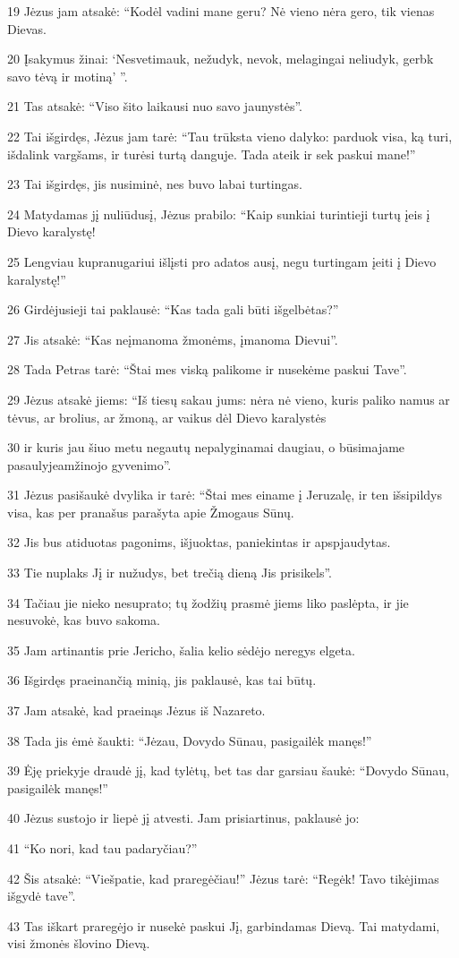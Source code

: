 \par 19 Jėzus jam atsakė: “Kodėl vadini mane geru? Nė vieno nėra gero, tik vienas Dievas. 
\par 20 Įsakymus žinai: ‘Nesvetimauk, nežudyk, nevok, melagingai neliudyk, gerbk savo tėvą ir motiną’ ”. 
\par 21 Tas atsakė: “Viso šito laikausi nuo savo jaunystės”. 
\par 22 Tai išgirdęs, Jėzus jam tarė: “Tau trūksta vieno dalyko: parduok visa, ką turi, išdalink vargšams, ir turėsi turtą danguje. Tada ateik ir sek paskui mane!” 
\par 23 Tai išgirdęs, jis nusiminė, nes buvo labai turtingas. 
\par 24 Matydamas jį nuliūdusį, Jėzus prabilo: “Kaip sunkiai turintieji turtų įeis į Dievo karalystę! 
\par 25 Lengviau kupranugariui išlįsti pro adatos ausį, negu turtingam įeiti į Dievo karalystę!” 
\par 26 Girdėjusieji tai paklausė: “Kas tada gali būti išgelbėtas?” 
\par 27 Jis atsakė: “Kas neįmanoma žmonėms, įmanoma Dievui”. 
\par 28 Tada Petras tarė: “Štai mes viską palikome ir nusekėme paskui Tave”. 
\par 29 Jėzus atsakė jiems: “Iš tiesų sakau jums: nėra nė vieno, kuris paliko namus ar tėvus, ar brolius, ar žmoną, ar vaikus dėl Dievo karalystės 
\par 30 ir kuris jau šiuo metu negautų nepalyginamai daugiau, o būsimajame pasaulyje­amžinojo gyvenimo”. 
\par 31 Jėzus pasišaukė dvylika ir tarė: “Štai mes einame į Jeruzalę, ir ten išsipildys visa, kas per pranašus parašyta apie Žmogaus Sūnų. 
\par 32 Jis bus atiduotas pagonims, išjuoktas, paniekintas ir apspjaudytas. 
\par 33 Tie nuplaks Jį ir nužudys, bet trečią dieną Jis prisikels”. 
\par 34 Tačiau jie nieko nesuprato; tų žodžių prasmė jiems liko paslėpta, ir jie nesuvokė, kas buvo sakoma. 
\par 35 Jam artinantis prie Jericho, šalia kelio sėdėjo neregys elgeta. 
\par 36 Išgirdęs praeinančią minią, jis paklausė, kas tai būtų. 
\par 37 Jam atsakė, kad praeinąs Jėzus iš Nazareto. 
\par 38 Tada jis ėmė šaukti: “Jėzau, Dovydo Sūnau, pasigailėk manęs!” 
\par 39 Ėję priekyje draudė jį, kad tylėtų, bet tas dar garsiau šaukė: “Dovydo Sūnau, pasigailėk manęs!” 
\par 40 Jėzus sustojo ir liepė jį atvesti. Jam prisiartinus, paklausė jo: 
\par 41 “Ko nori, kad tau padaryčiau?” 
\par 42 Šis atsakė: “Viešpatie, kad praregėčiau!” Jėzus tarė: “Regėk! Tavo tikėjimas išgydė tave”. 
\par 43 Tas iškart praregėjo ir nusekė paskui Jį, garbindamas Dievą. Tai matydami, visi žmonės šlovino Dievą.



